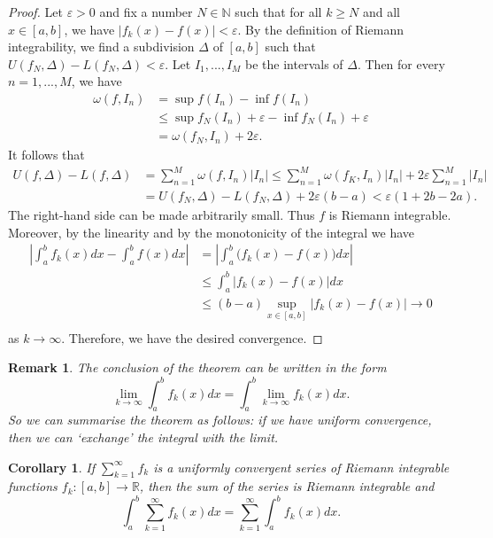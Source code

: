 \documentclass[a4paper,reqno]{amsart}
\numberwithin{equation}{section}
\newtheorem{corollary}[definition]{Corollary}
\newtheorem{remark}[definition]{Remark}
\def\R{\mathbb{R}}
\begin{document}
\begin{proof}
Let $\varepsilon > 0$ and fix a number $N \in \mathbb{N}$ such that for all $k \geq N$ and all $x \in [a, b]$, we have $|f_k (x) - f (x)| < \varepsilon$. 
By the definition of Riemann integrability, we find a subdivision $\Delta$ of $[a,b]$ such that $U(f_N,\Delta) - L(f_N,\Delta) < \varepsilon$. Let $I_1,...,I_M$ be the intervals of 
$\Delta$. Then for every $n = 1,...,M$, we have
\begin{align*}
\omega(f, I_n) &= \sup f(I_n) - \inf f(I_n)\\
&\leq \sup f_N (I_n) + \varepsilon - \inf f_N (I_n) + \varepsilon\\
&= \omega(f_N , I_n) + 2\varepsilon.
\end{align*}
It follows that
\begin{align*}
U(f,\Delta) - L(f,\Delta) &= \sum_{n=1}^M \omega(f, I_n) |I_n| \leq \sum_{n=1}^M \omega(f_K, I_n) |I_n| + 2\varepsilon\sum_{n=1}^M |I_n| \\
& = U(f_N,\Delta) - L(f_N,\Delta) + 2\varepsilon (b-a) < \varepsilon (1+ 2b - 2a).
\end{align*}
The right-hand side can be made arbitrarily small. Thus $f$ is Riemann integrable.
Moreover, by the linearity and by the monotonicity of the integral we have
\begin{align*}
\left|\int_a^b f_k(x)dx - \int_a^b f(x)dx\right| &= \left|\int_a^b \Big(f_k(x) - f(x)\Big)dx \right|\\
&\leq \int_a^b \Big|f_k(x) - f(x)\Big|dx\\
&\leq(b-a) \sup_{x\in [a,b]} \Big|f_k(x) - f(x)\Big| \to 0\\
\end{align*}%
as $k\to \infty$. Therefore, we have the desired convergence.
\end{proof}


\begin{remark}
The conclusion of the theorem can be written in the form
$$
\lim_{k\to \infty}\int_a^b f_k(x)dx = \int_a^b \lim_{k\to \infty} f_k(x)dx.
$$
So we can summarise the theorem as follows: if we have uniform convergence,
then we can `exchange' the integral with the limit.
\end{remark}

\begin{corollary}\label{series:i}
If $\sum_{k=1}^\infty f_k$ is a uniformly convergent series of Riemann integrable functions $f_k : [a, b] \to \R$, then the sum of the series is Riemann integrable and
$$
\int_a^b\sum_{k=1}^\infty f_k(x) dx = \sum_{k=1}^\infty \int_a^b f_k(x) dx.
$$
\end{corollary}
\end{document}
